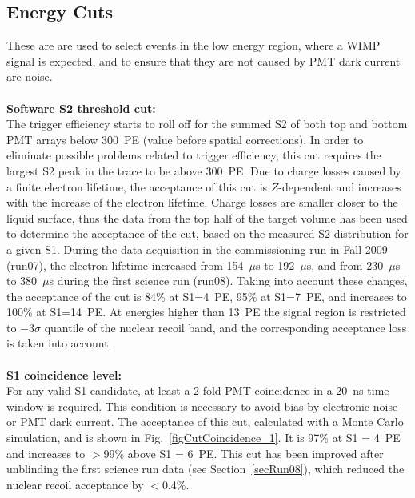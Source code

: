 \subsection{Energy Cuts}
\label{secEnergyCuts}
These are are used to select events in the low energy region, where a WIMP signal is expected, and to ensure that they are not caused by PMT dark current are noise.
\\
\\
{\bf Software S2 threshold cut:}\\
The trigger efficiency starts to roll off for the summed S2 of both top and bottom PMT arrays below 300~PE (value before spatial corrections). In order to eliminate possible problems related to trigger efficiency, this cut requires the largest S2 peak in the trace to be above 300~PE. Due to charge losses caused by a finite electron lifetime, the acceptance of this cut is $Z$-dependent and increases with the increase of the electron lifetime. Charge losses are smaller closer to the liquid surface, thus the data from the top half of the target volume has been used to determine the acceptance of the cut, based on the measured S2 distribution for a given S1. During the data acquisition in the commissioning run in Fall 2009 (run07), the electron lifetime increased from 154~$\mu$s  to 192~$\mu$s, and from 230~$\mu$s to 380~$\mu$s during the 
first science run (run08). Taking into account these changes, the acceptance of the cut is 84\% at S1=4~PE, 95\% at S1=7~PE, and increases to 100\% at S1=14~PE. At energies higher than 13~PE the signal region is restricted to $-$3$\sigma$ quantile of the nuclear recoil band, and the corresponding acceptance loss is taken into account.
\\
\\
{\bf S1 coincidence level:}\\
For any valid S1 candidate, at least a 2-fold PMT coincidence in a 20~ns time window is required. This condition is necessary to avoid bias by electronic noise or PMT dark current. The acceptance of this cut, calculated with a Monte Carlo simulation, and is shown in Fig.~\ref{figCutCoincidence_1}. It is 97\% at S1 = 4~PE and increases to $>$99\% above S1 = 6~PE. 
This cut has been improved after unblinding the first science run data (see Section~\ref{secRun08}), which reduced the nuclear recoil acceptance by $<$0.4\%.

